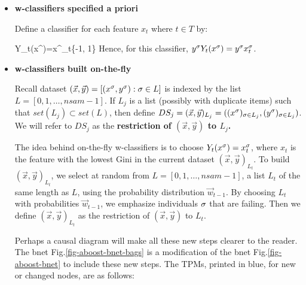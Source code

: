 \begin{itemize}
\item {\bf
w-classifiers specified a priori}

Define a classifier
for each feature $x_t$
where $t\in T$ by:

\beq
Y_t(x^\s)=x^\s_t\in \{-1, 1\}
\eeq
Hence, for this classifier,
$y^\sigma Y_t (x^\sigma)=y^\sigma x_t^\sigma$.

\item {\bf w-classifiers built
on-the-fly}

Recall
dataset
$(\vec{x},\vec{y})=
[(x^\sigma, y^\sigma):\sigma\in L]$
is indexed by the  list
 $L=[0, 1, \ldots, nsam-1]$.
If
$L_j$ is a list (possibly with
duplicate items)
such that $set(L_j)\subset set(L)$,
 then
define
$DS_j=(\vec{x}, \vec{y})_{L_j}=
((x^\sigma)_{\sigma\in L_j},
(y^\sigma)_{\sigma\in L_j})$.
We will
refer to $DS_j$
as the {\bf restriction of
$(\vec{x}, \vec{y})$ to $L_j$.}

The idea
behind on-the-fly
w-classifiers is to choose
$Y_t(x^\sigma)=x_t^\sigma$,
where $x_t$
is the feature with the lowest
Gini in
the current dataset
$(\vec{x}, \vec{y})_{L_t}$.
To build
$(\vec{x}, \vec{y})_{L_t}$,
we select at random
from $L=[0, 1, \ldots, nsam-1]$,
a list $L_t$
of the same
length as $L$,
using the probability
distribution
$\vec{w}_{t-1}$.
By choosing
$L_t$
with
probabilities $\vec{w}_{t-1}$,
we emphasize
individuals $\sigma$
that are failing.
Then
we define
$(\vec{x},\vec{y})_{L_t}$
as the restriction of
$(\vec{x},\vec{y})$
to $L_t$.

Perhaps a causal diagram
will make all these
new steps clearer
to the reader.
The bnet
Fig.\ref{fig-aboost-bnet-bags}
is a modification of the
 bnet
Fig.\ref{fig-aboost-bnet}
to include these new steps.
The TPMs,
printed in blue,
for new or changed nodes, are as
follows:




\end{itemize}
